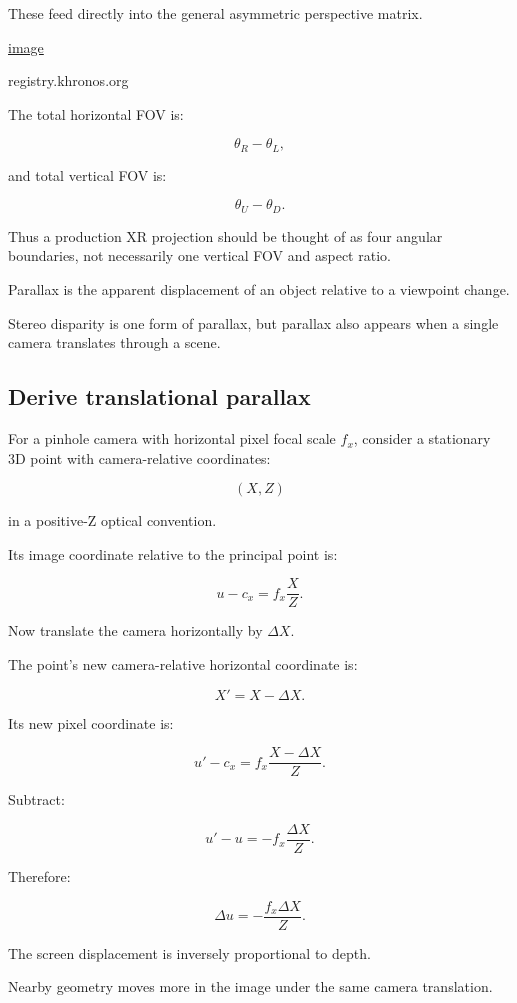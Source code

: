 These feed directly into the general asymmetric perspective matrix. 

\href{https://www.google.com/s2/favicons?domain=https://registry.khronos.org&sz=32}{image}

registry.khronos.org

The total horizontal FOV is:

\[ \theta_R-\theta_L, \]

and total vertical FOV is:

\[ \theta_U-\theta_D. \]

Thus a production XR projection should be thought of as four angular boundaries, not necessarily one vertical FOV and aspect ratio.

Parallax is the apparent displacement of an object relative to a viewpoint change.

Stereo disparity is one form of parallax, but parallax also appears when a single camera translates through a scene.

\subsection{Derive translational parallax}\label{02-foundations-ii-ch035-derive-translational-parallax}

For a pinhole camera with horizontal pixel focal scale \(f_x\), consider a stationary 3D point with camera-relative coordinates:

\[ (X,Z) \]

in a positive-Z optical convention.

Its image coordinate relative to the principal point is:

\[ u-c_x=f_x\frac XZ. \]

Now translate the camera horizontally by \(\Delta X\).

The point's new camera-relative horizontal coordinate is:

\[ X'=X-\Delta X. \]

Its new pixel coordinate is:

\[ u'-c_x=f_x\frac{X-\Delta X}{Z}. \]

Subtract:

\[ u'-u=-f_x\frac{\Delta X}{Z}. \]

Therefore:

\[ \boxed{ \Delta u=-\frac{f_x\Delta X}{Z}. } \]

The screen displacement is inversely proportional to depth.

Nearby geometry moves more in the image under the same camera translation.

